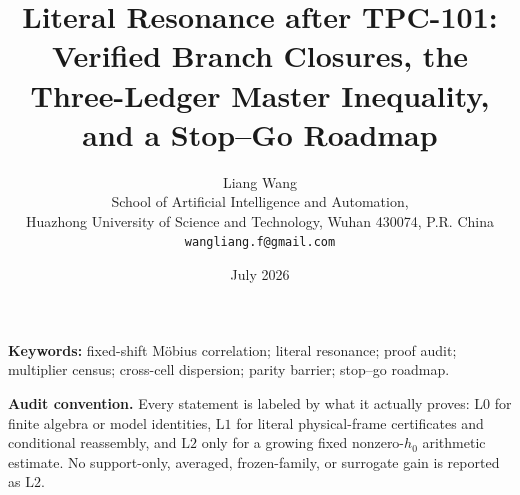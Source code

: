 \documentclass[11pt]{article}
\title{Literal Resonance after TPC-101:\\
Verified Branch Closures, the Three-Ledger Master Inequality,\\
and a Stop--Go Roadmap}
\author{Liang Wang\\
School of Artificial Intelligence and Automation,\\
Huazhong University of Science and Technology, Wuhan 430074, P.R. China\\
\texttt{wangliang.f@gmail.com}}
\date{July 2026}
\theoremstyle{remark}
\newcommand{\Lzero}{\mathrm{L0}}
\newcommand{\Lone}{\mathrm{L1}}
\newcommand{\Ltwo}{\mathrm{L2}}
\begin{document}
\maketitle



\noindent\textbf{Keywords:} fixed-shift M\"obius correlation;
literal resonance; proof audit; multiplier census; cross-cell
dispersion; parity barrier; stop--go roadmap.

\medskip
\noindent\textbf{Audit convention.}
Every statement is labeled by what it actually proves:
\(\Lzero\) for finite algebra or model identities, \(\Lone\) for
literal physical-frame certificates and conditional reassembly, and
\(\Ltwo\) only for a growing fixed nonzero-\(h_0\) arithmetic
estimate.  No support-only, averaged, frozen-family, or surrogate
gain is reported as \(\Ltwo\).












\begingroup
\footnotesize
\raggedright


\endgroup
\end{document}
